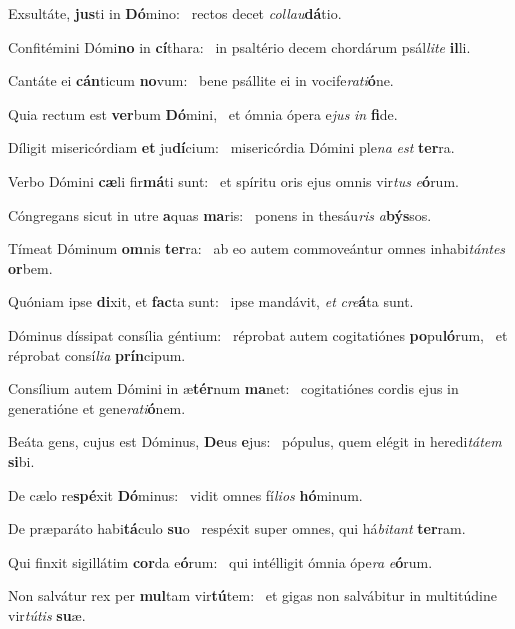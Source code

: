\item Exsultáte, \textbf{jus}ti in \textbf{Dó}mino:~\psstar{} rectos decet \textit{collau}\textbf{dá}tio.
\item Confitémini Dómi\textbf{no} in \textbf{cí}thara:~\psstar{} in psaltério decem chordárum psál\textit{lite} \textbf{il}li.
\item Cantáte ei \textbf{cán}ticum \textbf{no}vum:~\psstar{} bene psállite ei in vocife\textit{rati}\textbf{ó}ne.
\item Quia rectum est \textbf{ver}bum \textbf{Dó}mini,~\psstar{} et ómnia ópera e\textit{jus} \textit{in} \textbf{fi}de.
\item Díligit misericórdiam \textbf{et} ju\textbf{dí}cium:~\psstar{} misericórdia Dómini ple\textit{na} \textit{est} \textbf{ter}ra.
\item Verbo Dómini \textbf{cæ}li fir\textbf{má}ti sunt:~\psstar{} et spíritu oris ejus omnis vir\textit{tus} \textit{e}\textbf{ó}rum.
\item Cóngregans sicut in utre \textbf{a}quas \textbf{ma}ris:~\psstar{} ponens in thesáu\textit{ris} \textit{a}\textbf{býs}sos.
\item Tímeat Dóminum \textbf{om}nis \textbf{ter}ra:~\psstar{} ab eo autem commoveántur omnes inhabi\textit{tántes} \textbf{or}bem.
\item Quóniam ipse \textbf{di}xit, et \textbf{fac}ta sunt:~\psstar{} ipse mandávit, \textit{et} \textit{cre}\textbf{á}ta sunt.
\item Dóminus díssipat consília géntium:~\pscross{} réprobat autem cogitatiónes \textbf{po}pu\textbf{ló}rum,~\psstar{} et réprobat consí\textit{lia} \textbf{prín}cipum.
\item Consílium autem Dómini in æ\textbf{tér}num \textbf{ma}net:~\psstar{} cogitatiónes cordis ejus in generatióne et gene\textit{rati}\textbf{ó}nem.
\item Beáta gens, cujus est Dóminus, \textbf{De}us \textbf{e}jus:~\psstar{} pópulus, quem elégit in heredi\textit{tátem} \textbf{si}bi.
\item De cælo re\textbf{spé}xit \textbf{Dó}minus:~\psstar{} vidit omnes fí\textit{lios} \textbf{hó}minum.
\item De præparáto habi\textbf{tá}culo \textbf{su}o~\psstar{} respéxit super omnes, qui há\textit{bitant} \textbf{ter}ram.
\item Qui finxit sigillátim \textbf{cor}da e\textbf{ó}rum:~\psstar{} qui intélligit ómnia ópe\textit{ra} \textit{e}\textbf{ó}rum.
\item Non salvátur rex per \textbf{mul}tam vir\textbf{tú}tem:~\psstar{} et gigas non salvábitur in multitúdine vir\textit{tútis} \textbf{su}æ.
